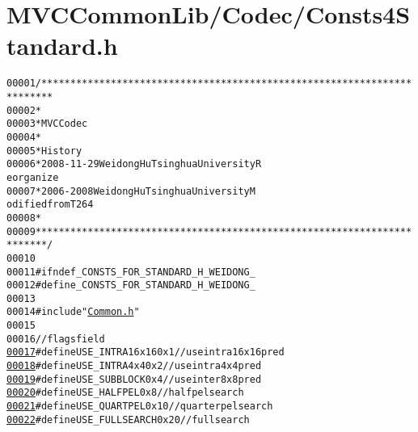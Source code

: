 \hypertarget{_consts4_standard_8h_source}{
\section{MVCCommonLib/Codec/Consts4Standard.h}
}


\begin{footnotesize}\begin{alltt}
00001 \textcolor{comment}{/************************************************************************}
00002 \textcolor{comment}{ *}
00003 \textcolor{comment}{ * MVC Codec}
00004 \textcolor{comment}{ * }
00005 \textcolor{comment}{ * History}
00006 \textcolor{comment}{ * 2008-11-29           Weidong Hu              Tsinghua University             R
      eorganize}
00007 \textcolor{comment}{ * 2006-2008            Weidong Hu              Tsinghua University             M
      odified from T264}
00008 \textcolor{comment}{ * }
00009 \textcolor{comment}{ ************************************************************************/}
00010 
00011 \textcolor{preprocessor}{#ifndef \_CONSTS\_FOR\_STANDARD\_H\_WEIDONG\_}
00012 \textcolor{preprocessor}{}\textcolor{preprocessor}{#define \_CONSTS\_FOR\_STANDARD\_H\_WEIDONG\_}
00013 \textcolor{preprocessor}{}
00014 \textcolor{preprocessor}{#include "\hyperlink{_common_8h}{Common.h}"}
00015 
00016 \textcolor{comment}{// flags field}
\hypertarget{_consts4_standard_8h_source_l00017}{}\hyperlink{_consts4_standard_8h_adcfd7332f177e402eb92a6f008bd01fe}{00017} \textcolor{preprocessor}{#define USE\_INTRA16x16 0x1      // use intra 16x16 pred}
\hypertarget{_consts4_standard_8h_source_l00018}{}\hyperlink{_consts4_standard_8h_a3e54352ab30d9c07c2c2846126d3d0c4}{00018} \textcolor{preprocessor}{}\textcolor{preprocessor}{#define USE\_INTRA4x4   0x2      // use intra 4x4   pred}
\hypertarget{_consts4_standard_8h_source_l00019}{}\hyperlink{_consts4_standard_8h_a9a3d3071ca4b896bbc843c85d4308044}{00019} \textcolor{preprocessor}{}\textcolor{preprocessor}{#define USE\_SUBBLOCK   0x4      // use inter 8x8   pred}
\hypertarget{_consts4_standard_8h_source_l00020}{}\hyperlink{_consts4_standard_8h_aba10d0b94bbc0cf5e2c7bb5775c906f0}{00020} \textcolor{preprocessor}{}\textcolor{preprocessor}{#define USE\_HALFPEL    0x8      // half pel search}
\hypertarget{_consts4_standard_8h_source_l00021}{}\hyperlink{_consts4_standard_8h_ac881be3b5e0682e809daa37fe68663c6}{00021} \textcolor{preprocessor}{}\textcolor{preprocessor}{#define USE\_QUARTPEL   0x10     // quarter pel search}
\hypertarget{_consts4_standard_8h_source_l00022}{}\hyperlink{_consts4_standard_8h_a8478776d33dff567bee241a3d0aeaeac}{00022} \textcolor{preprocessor}{}\textcolor{preprocessor}{#define USE\_FULLSEARCH 0x20     // full search}

\end{alltt}
\end{footnotesize}
